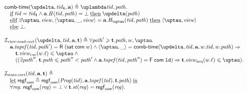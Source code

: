 \[\begin{array}{l}
\deltaHmap(\delta, \tId_{\tT}, \aT) \triangleq \lambda \tId, \cpath. \\
  \quad \textIf \tId = \tId_{\tT} \land \aT.\hmap(\tId, \cpath) = \bot \; \textThen \delta(\cpath) \\
  \quad \textElif \exists \tau, \R, \angled{\tau, \_, \R} = \aT.\tmap(\tId, \cpath) \; \textThen \angled{\tau, \R} \\
  \quad \textElse \bot. \\
\\
\invViewReadCERT(\delta, \tId, \aT, \tT) \triangleq
  \forall \cpath' \ge \tT.\cpath, \w, \tau. \\
\quad \aT.\tapef(\tId, \cpath') = \tapeRead{(\tapeSatisfied{\Committed}{\w})} \land
   \angled{\tau, \_} = \deltaHmap(\delta, \tId, \aT, \w.\tId, \w.\cpath) \Rightarrow \\
\quad \quad \tT.\Rcur(\w.\loc) \le \tau \land {} \\
\quad \quad ((\exists \cpath''. \; \tT.\cpath \le \cpath'' < \cpath' \land 
             \aT.\tapef(\tId, \cpath'') = \tapeFence{\Committed}{\LD}) \Rightarrow \tT.\Racq(\w.\loc) \le \tau). \\
\\
\invStateCERT(\tId, \aT, \tT) \triangleq \\
\quad \textLet \regstcom \triangleq \regstcom(\Cfarm(\tId), \aT.\tapef(\tId), \tT.\cpath) \; \textIn \\
\quad \forall \reg. \; \regstcom(\reg) = \bot \lor \tT.\PromState(\reg) = \regstcom(\reg).\\
\end{array}\]

